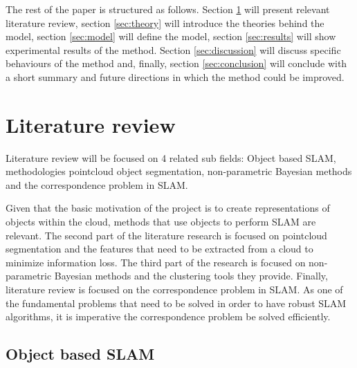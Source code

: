 \documentclass[twoside,hidelinks]{article}
\begin{document}
The rest of the paper is structured as follows. Section \ref{sec:literature} will present relevant literature review, section \ref{sec:theory} will introduce the theories behind the model, section \ref{sec:model} will define the model, section \ref{sec:results} will show experimental results of the method. Section \ref{sec:discussion} will discuss specific behaviours of the method and, finally, section \ref{sec:conclusion} will conclude with a short summary and future directions in which the method could be improved.


\newpage
\section{Literature review}
\label{sec:literature}

Literature review will be focused on 4 related sub fields: Object based SLAM, methodologies pointcloud object segmentation, non-parametric Bayesian methods and the correspondence problem in SLAM.

Given that the basic motivation of the project is to create representations of objects within the cloud, methods that use objects to perform SLAM are relevant. The second part of the literature research is focused on pointcloud segmentation and the features that need to be extracted from a cloud to minimize information loss. The third part of the research is focused on non-parametric Bayesian methods and the clustering tools they provide. Finally, literature review is focused on the correspondence problem in SLAM. As one of the fundamental problems that need to be solved in order to have robust SLAM algorithms, it is imperative the correspondence problem be solved efficiently. 

\subsection{Object based SLAM}
\end{document}
